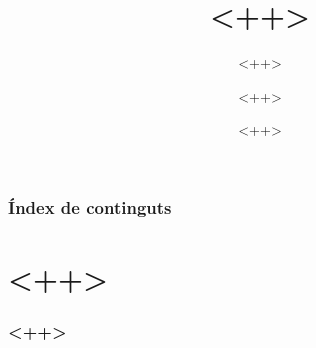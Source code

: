 \documentclass{beamer}
\title[<++>]{<++>}
\subtitle{<++>}
\author{<++>}
\institute[<++>]{<++>}
\date{<++>}
\begin{document}
% 
\frame{\titlepage}

\begin{frame}
 	\frametitle{Índex de continguts}
 	\tableofcontents
\end{frame}

\section{<++>}

\begin{frame}
	\frametitle{<++>}
\end{frame}
 
%
% 
% 	 
% 	 
% 

\end{document}

